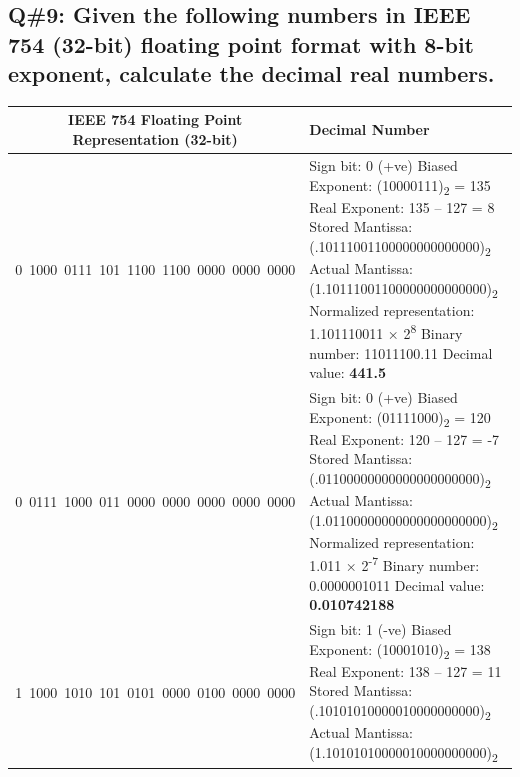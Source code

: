 \subsection{Q\#9: Given the following numbers in IEEE 754 (32-bit) floating point format with 8-bit exponent, calculate the decimal real numbers.}
\begin{longtable}{|c|p{10cm}|}
\hline
\textbf{IEEE 754 Floating Point Representation (32-bit)} & \textbf{Decimal Number} \\
\hline
0\ 1000\ 0111\ 101\ 1100\ 1100\ 0000\ 0000\ 0000 & 
Sign bit: 0 (+ve) \newline
Biased Exponent: (10000111)\textsubscript{2} = 135 \newline
Real Exponent: 135 – 127 = 8 \newline
Stored Mantissa: (.10111001100000000000000)\textsubscript{2} \newline
Actual Mantissa: (1.10111001100000000000000)\textsubscript{2} \newline
Normalized representation: 1.101110011 × 2\textsuperscript{8} \newline
Binary number: 11011100.11 \newline
Decimal value: \textbf{441.5} \\
\hline
0\ 0111\ 1000\ 011\ 0000\ 0000\ 0000\ 0000\ 0000 & 
Sign bit: 0 (+ve) \newline
Biased Exponent: (01111000)\textsubscript{2} = 120 \newline
Real Exponent: 120 – 127 = -7 \newline
Stored Mantissa: (.01100000000000000000000)\textsubscript{2} \newline
Actual Mantissa: (1.01100000000000000000000)\textsubscript{2} \newline
Normalized representation: 1.011 × 2\textsuperscript{-7} \newline
Binary number: 0.0000001011 \newline
Decimal value: \textbf{0.010742188} \\
\hline
1\ 1000\ 1010\ 101\ 0101\ 0000\ 0100\ 0000\ 0000 & 
Sign bit: 1 (-ve) \newline
Biased Exponent: (10001010)\textsubscript{2} = 138 \newline
Real Exponent: 138 – 127 = 11 \newline
Stored Mantissa: (.10101010000010000000000)\textsubscript{2} \newline
Actual Mantissa: (1.10101010000010000000000)\textsubscript{2} \newline

\end{longtable}
